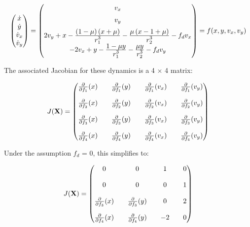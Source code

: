 \begin{equation*}
    \begin{pmatrix}
        \dot{x}   \\
        \dot{y}   \\
        \dot{v}_x \\
        \dot{v}_y
    \end{pmatrix} =
    \begin{pmatrix}
        v_x                                                                                                        \\[0.2cm]
        v_y                                                                                                        \\[0.2cm]
        2v_y + x - \frac{\displaystyle (1-\mu) \left(x+\mu\right)}{\displaystyle r_1^3} - \frac{\displaystyle \mu \left(x-1+\mu\right)}{\displaystyle r_2^3} - f_d v_x \\[0.2cm]
        -2v_x + y - \frac{\displaystyle 1-\mu y}{\displaystyle r_1^3} - \frac{\displaystyle \mu y}{\displaystyle r_2^3} - f_d v_y
    \end{pmatrix}
    = f(x,y,v_x,v_y)
\end{equation*}

The associated Jacobian for these dynamics is a 4 $\times$ 4 matrix:

\begin{equation*}
    J(\bf{X}) =
    \begin{pmatrix}
        \frac{\partial}{\partial f_1} (x) &  & \frac{\partial}{\partial f_1} (y) &  & \frac{\partial}{\partial f_1} (v_x) &  & \frac{\partial}{\partial f_1} (v_y) \\[0.4cm]
        \frac{\partial}{\partial f_2} (x) &  & \frac{\partial}{\partial f_2} (y) &  & \frac{\partial}{\partial f_2} (v_x) &  & \frac{\partial}{\partial f_2} (v_y) \\[0.4cm]
        \frac{\partial}{\partial f_3} (x) &  & \frac{\partial}{\partial f_3} (y) &  & \frac{\partial}{\partial f_3} (v_x) &  & \frac{\partial}{\partial f_3} (v_y) \\[0.4cm]
        \frac{\partial}{\partial f_4} (x) &  & \frac{\partial}{\partial f_4} (y) &  & \frac{\partial}{\partial f_4} (v_x) &  & \frac{\partial}{\partial f_4} (v_y)
    \end{pmatrix}
\end{equation*}

Under the assumption $f_d$ = 0, this simplifies to:

\begin{equation}
    J(\bf{X}) =
    \begin{pmatrix}
        0               &  & 0               &  & 1  &  & 0 \\[0.4cm]
        0               &  & 0               &  & 0  &  & 1 \\[0.4cm]
        \pderiv{f_3}{x} &  & \pderiv{f_3}{y} &  & 0  &  & 2 \\[0.4cm]
        \pderiv{f_4}{x} &  & \pderiv{f_4}{y} &  & -2 &  & 0
    \end{pmatrix} %
    \label{eq:Jacobian}
\end{equation}

